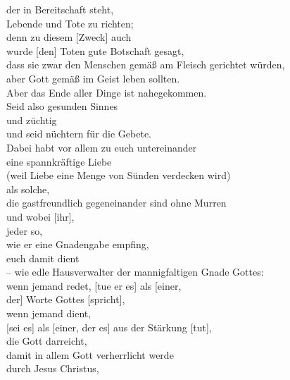                 der in Bereitschaft steht, \\
                Lebende und Tote zu richten;\\
            denn zu diesem [Zweck] auch \\
                wurde [den] Toten gute Botschaft gesagt, \\
                dass sie zwar den Menschen gemäß am Fleisch gerichtet würden, \\
                aber Gott gemäß im Geist leben sollten. \\
    Aber das Ende aller Dinge ist nahegekommen. \\
        Seid also gesunden Sinnes \\
            und züchtig \\
            und seid nüchtern für die Gebete.\\
        Dabei habt vor allem zu euch untereinander \\
            eine spannkräftige Liebe \\
                (weil Liebe eine Menge von Sünden verdecken wird)\\
            als solche, \\
                die gastfreundlich gegeneinander sind ohne Murren \\
                und wobei [ihr], \\
                jeder so, \\
                wie er eine Gnadengabe empfing, \\
                euch damit dient \\
                – wie edle Hausverwalter der mannigfaltigen Gnade Gottes: \\
                    wenn jemand redet, [tue er es] als [einer, \\
                        der] Worte Gottes [spricht], \\
                    wenn jemand dient, \\
                        [sei es] als [einer, der es] aus der Stärkung [tut], \\
                        die Gott darreicht, \\
                    damit in allem Gott verherrlicht werde \\
                    durch Jesus Christus, \\
